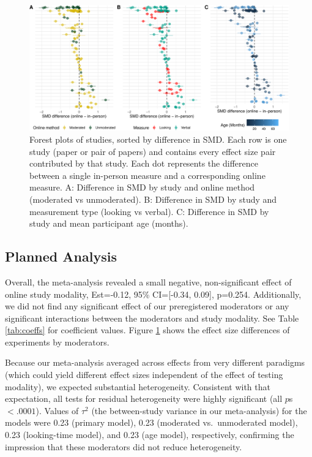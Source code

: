 \documentclass[
  man,floatsintext]{apa6}
\begin{document}
\begin{figure}[h]

{\centering \includegraphics[width=1\linewidth]{OnlineMA_main_files/figure-latex/forest-1} 

}

\caption{Forest plots of studies, sorted by difference in SMD. Each row is one study (paper or pair of papers) and contains every effect size pair contributed by that study. Each dot represents the difference between a single in-person measure and a corresponding online measure. A: Difference in SMD by study and online method (moderated vs unmoderated). B: Difference in SMD by study and measurement type (looking vs verbal). C: Difference in SMD by study and mean participant age (months).}\label{fig:forest}
\end{figure}

\hypertarget{planned-analysis}{%
\subsection{Planned Analysis}\label{planned-analysis}}

Overall, the meta-analysis revealed a small negative, non-significant effect of online study modality, Est=-0.12, 95\% CI={[}-0.34, 0.09{]}, p=0.254. Additionally, we did not find any significant effect of our preregistered moderators or any significant interactions between the moderators and study modality. See Table \ref{tab:coeffs} for coefficient values. Figure \ref{fig:forest} shows the effect size differences of experiments by moderators.

Because our meta-analysis averaged across effects from very different paradigms (which could yield different effect sizes independent of the effect of testing modality), we expected substantial heterogeneity. Consistent with that expectation, all tests for residual heterogeneity were highly significant (all \(p\)s \(< .0001\)). Values of \(\tau^2\) (the between-study variance in our meta-analysis) for the models were 0.23 (primary model), 0.23 (moderated vs.~unmoderated model), 0.23 (looking-time model), and 0.23 (age model), respectively, confirming the impression that these moderators did not reduce heterogeneity.
\end{document}
